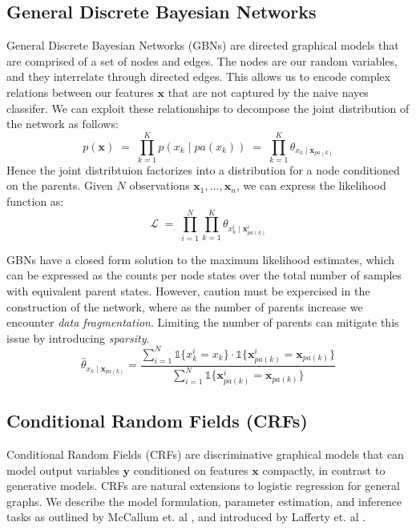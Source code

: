 \documentclass{article}
\begin{document}
\subsection{General Discrete Bayesian Networks}
\label{sec:GBN}
General Discrete Bayesian Networks (GBNs) are directed graphical models that are
comprised of a set of nodes and edges. The nodes are our random variables,
and they interrelate through directed edges. This allows us to
encode complex relations between our features $\mathbf{x}$ that are not
captured by the naive nayes classifer. We can exploit these relationships
to decompose the joint distribution of the network as follows:
\begin{equation}
  p(\mathbf{x}) \; = \; \prod_{k=1}^K p(x_k \mid pa(x_k)) \; = \; \prod_{k=1}^K \theta_{x_k \mid \mathbf{x}_{pa(k)}}
\end{equation}
Hence the joint distribtuion factorizes into a distribution for a node
conditioned on the parents.
Given $N$ observations $\mathbf{x}_1, \hdots, \mathbf{x}_n$, we can express
the likelihood function as:
\begin{equation}
  \mathcal{L} \; = \; \prod_{i=1}^{N} \prod_{k=1}^{K} \theta_{x_{k}^{i} \mid \mathbf{x}_{pa(k)}^{i}}
\end{equation}

GBNs have a closed form solution to the maximum likelihood estimates, which can
be expressed as the counts per node states over the total number of samples
with equivalent parent states. However, caution must be expercised in the
construction of the network, where as the number of parents increase we
encounter \textit{data fragmentation}. Limiting the number of parents can
mitigate this issue by introducing \textit{sparsity}.
\begin{equation}
  \hat{\theta}_{x_k \mid \mathbf{x}_{pa(k)}} = \frac{ \sum_{i=1}^{N} \mathds{1} \{ x_{k}^{i} = x_k \} \cdot \mathds{1} \{\mathbf{x}_{pa(k)}^{i} = \mathbf{x}_{pa(k)} \} }{ \sum_{i=1}^{N} \mathds{1} \{\mathbf{x}_{pa(k)}^{i} = \mathbf{x}_{pa(k)} \} }
\end{equation}
\subsection{Conditional Random Fields (CRFs)}
\label{sec:CRF}
Conditional Random Fields (CRFs) are discriminative graphical models that
can model output variables $\mathbf{y}$ conditioned on features $\mathbf{x}$
compactly, in contrast to generative models. CRFs are natural extensions
to logistic regression for general graphs. We describe the model formulation,
parameter estimation, and inference tasks as outlined by McCallum et. al \cite{McCallumCRF},
and introduced by Lafferty et. al \cite{CRF}.
\end{document}
